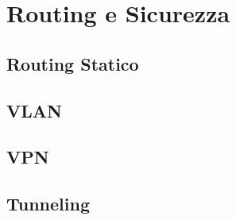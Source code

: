 \section{Routing e Sicurezza}
\subsection{Routing Statico}
\subsection{VLAN}
\subsection{VPN}
\subsection{Tunneling}